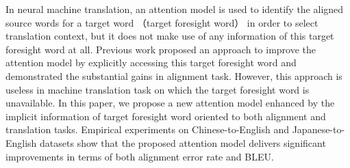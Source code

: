 In neural machine translation, an attention model is used to identify the aligned source words for a target word （target foresight word） in order to select translation context, but it does not make use of any information of this target foresight word at all. Previous work proposed an approach to improve the attention model by explicitly accessing this target foresight word and demonstrated the substantial gains in alignment task. However, this approach is useless in machine translation task on which the target foresight word is unavailable. In this paper, we propose a new attention model enhanced by the implicit information of target foresight word oriented to both alignment and translation tasks. Empirical experiments on Chinese-to-English and Japanese-to-English datasets show that the proposed attention model delivers significant improvements in terms of both alignment error rate and BLEU.
